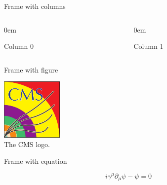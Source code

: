 \documentclass[10pt]{beamer}
\begin{document}



\begin{frame}[fragile]{Frame with columns}
\vspace{-0.5cm}
\begin{columns}
\begin{column}{0.5\textwidth}
\begin{itemize}\scriptsize{
\itemsep0em
\item Column 0}
\end{itemize}
\end{column}
\begin{column}{0.5\textwidth}
\begin{itemize}\scriptsize{
\itemsep0em
\item Column 1}
\end{itemize}
\end{column}
\end{columns}
\end{frame}

\begin{frame}[fragile]{Frame with figure}

\center
\includegraphics[width=3cm]{CMS-Color-Var1.pdf}\\
\scriptsize{The CMS logo.}\\


\end{frame}

\begin{frame}[fragile]{Frame with equation}

$$i\gamma^{\mu}\partial_{\mu}\psi-\psi=0$$
\end{frame}
\end{document}
